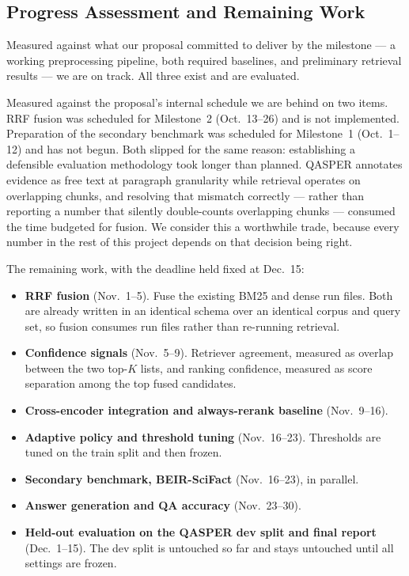 \documentclass[sigconf,nonacm]{acmart}
\begin{document}
\subsection{Progress Assessment and Remaining Work}

Measured against what our proposal committed to deliver by the milestone --- a
working preprocessing pipeline, both required baselines, and preliminary
retrieval results --- we are on track. All three exist and are evaluated.

Measured against the proposal's internal schedule we are behind on two items.
RRF fusion was scheduled for Milestone~2 (Oct.~13--26) and is not implemented.
Preparation of the secondary benchmark was scheduled for Milestone~1
(Oct.~1--12) and has not begun. Both slipped for the same reason: establishing a
defensible evaluation methodology took longer than planned. QASPER annotates
evidence as free text at paragraph granularity while retrieval operates on
overlapping chunks, and resolving that mismatch correctly --- rather than
reporting a number that silently double-counts overlapping chunks --- consumed
the time budgeted for fusion. We consider this a worthwhile trade, because every
number in the rest of this project depends on that decision being right.

The remaining work, with the deadline held fixed at Dec.~15:

\begin{itemize}
\item \textbf{RRF fusion} (Nov.~1--5). Fuse the existing BM25 and dense run
files. Both are already written in an identical schema over an identical corpus
and query set, so fusion consumes run files rather than re-running retrieval.
\item \textbf{Confidence signals} (Nov.~5--9). Retriever agreement, measured as
overlap between the two top-$K$ lists, and ranking confidence, measured as score
separation among the top fused candidates.
\item \textbf{Cross-encoder integration and always-rerank baseline}
(Nov.~9--16).
\item \textbf{Adaptive policy and threshold tuning} (Nov.~16--23). Thresholds
are tuned on the train split and then frozen.
\item \textbf{Secondary benchmark, BEIR-SciFact} (Nov.~16--23), in parallel.
\item \textbf{Answer generation and QA accuracy} (Nov.~23--30).
\item \textbf{Held-out evaluation on the QASPER dev split and final report}
(Dec.~1--15). The dev split is untouched so far and stays untouched until all
settings are frozen.
\end{itemize}
\end{document}
